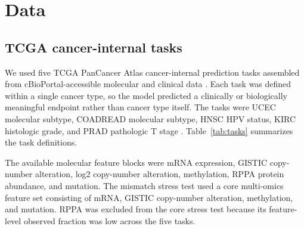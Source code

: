 \section{Data}

\subsection{TCGA cancer-internal tasks}

We used five TCGA PanCancer Atlas cancer-internal prediction tasks assembled from cBioPortal-accessible molecular and clinical data \cite{cerami_cbioportal_2012,gao_cbioportal_2013,hoadley_pancancer_2018}. Each task was defined within a single cancer type, so the model predicted a clinically or biologically meaningful endpoint rather than cancer type itself. The tasks were UCEC molecular subtype, COADREAD molecular subtype, HNSC HPV status, KIRC histologic grade, and PRAD pathologic T stage \cite{tcga_ucec_2013,tcga_coadread_2012,tcga_hnsc_2015,tcga_kirc_2013,tcga_prad_2015}. Table~\ref{tab:tasks} summarizes the task definitions.

\begin{table}[ht]
\centering
\caption{Cancer-internal tasks used for the alignment and mismatch benchmark.}
\label{tab:tasks}
\end{table}

The available molecular feature blocks were mRNA expression, GISTIC copy-number alteration, log2 copy-number alteration, methylation, RPPA protein abundance, and mutation. The mismatch stress test used a core multi-omics feature set consisting of mRNA, GISTIC copy-number alteration, methylation, and mutation. RPPA was excluded from the core stress test because its feature-level observed fraction was low across the five tasks.


